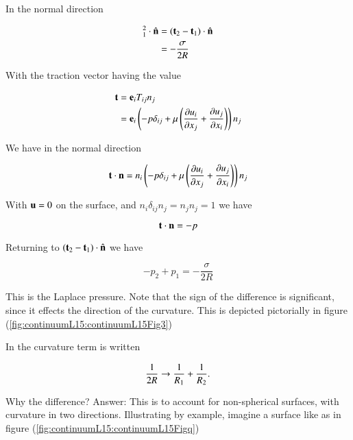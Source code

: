 In the normal direction

\begin{align*}
[\Bt]_1^2 \cdot \ncap
&= (\Bt_2 - \Bt_1) \cdot \ncap \\
&= -\frac{\sigma}{2 R} 
\end{align*}

With the traction vector having the value

\begin{align*}
\Bt 
&= \Be_i T_{ij} n_j \\
&= 
\Be_i \left( 
-p \delta_{ij} + \mu \left( 
\PD{x_j}{u_i}
+\PD{x_i}{u_j}
\right)
\right)
n_j
\end{align*}

We have in the normal direction

\begin{equation}\label{eqn:continuumL15:10}
\Bt \cdot \Bn 
=
n_i \left( 
-p \delta_{ij} + \mu \left( 
\PD{x_j}{u_i}
+\PD{x_i}{u_j}
\right)
\right) n_j
\end{equation}

With $\Bu = 0$ on the surface, and $n_i \delta_{ij} n_j = n_j n_j = 1$ we have

\begin{equation}\label{eqn:continuumL15:30}
\Bt \cdot \Bn = -p
\end{equation}

Returning to $(\Bt_2 - \Bt_1) \cdot \ncap$ we have

\begin{equation}\label{eqn:continuumL15:50}
\boxed{
-p_2 + p_1 = -\frac{\sigma}{2 R} 
}
\end{equation}

This is the Laplace pressure.  Note that the sign of the difference is significant, since it effects the direction of the curvature.  This is depicted pictorially in figure (\ref{fig:continuumL15:continuumL15Fig3})

 In \citep{landau1987course} the curvature term is written

\begin{equation}\label{eqn:continuumL15:70}
\inv{2 R} \rightarrow \inv{R_1} + \inv{R_2}.
\end{equation}

Why the difference?  Answer: This is to account for non-spherical surfaces, with curvature in two directions.  Illustrating by example, imagine a surface like as in figure (\ref{fig:continuumL15:continuumL15Figq})

